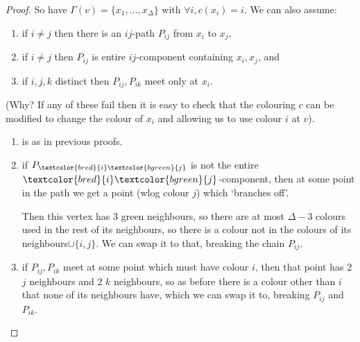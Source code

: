 \documentclass{article}
\newcommand{\red}[1]{\textcolor{bred}{#1}}
\newcommand{\green}[1]{\textcolor{bgreen}{#1}}
\begin{document}
\begin{proof}
    So have $\Gamma(v) = \{x_1, \dotsc, x_\Delta\}$ with $\forall i, c(x_i) = i$.
    We can also assume:
    \begin{enumerate}[label=(\roman*)]
        \item if $i \neq j$ then there is an $ij$-path $P_{ij}$ from $x_i$ to $x_j$,
        \item if $i \neq j$ then $P_{ij}$ is entire $ij$-component containing $x_i,x_j$, and
        \item if $i, j, k$ distinct then $P_{ij}, P_{ik}$ meet only at $x_i$.
    \end{enumerate}
    (Why? If any of these fail then it is easy to check that the colouring $c$ can be modified to change the colour of $x_i$ and allowing us to use colour $i$ at $v$).
    \begin{enumerate}[label=(\roman*)]
        \item is as in previous proofs.
        \item if $P_{\red{i}\green{j}}$ is not the entire $\red{i}\green{j}$-component, then
            at some point in the path we get a point (wlog colour \green{$j$}) which `branches off'.
            \begin{center}
            \end{center}
            Then this vertex has 3 \green{green} neighbours, so there are at most $\Delta - 3$ colours used in the rest of its neighbours, so there is a colour not in the colours of its neighbours$\cup \{i,j\}$.
            We can swap it to that, breaking the chain $P_{ij}$.
        \item if $P_{ij}, P_{ik}$ meet at some point which must have colour $i$, then that point has 2 $j$ neighbours and 2 $k$ neighbours, so as before there is a colour other than $i$ that none of its neighbours have, which we can swap it to, breaking $P_{ij}$ and $P_{ik}$.
    \end{enumerate}


\end{proof}
\end{document}
